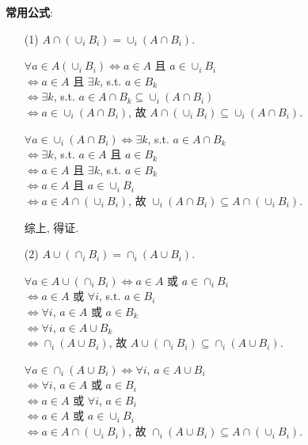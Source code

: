 \documentclass{note}
\begin{document}
\textbf{常用公式}:
\begin{itemize}
    \item[(1)] $A\cap(\cup_i B_i)=\cup_i(A\cap B_i)$.
    \begin{pf}
        $\forall a\in A(\cup_i B_i)\Longleftrightarrow a\in A$ 且 $a\in \cup_iB_i$\\
        $\Longleftrightarrow a\in A$ 且 $\exists k$, s.t. $a\in B_k$\\
        $\Longleftrightarrow\exists k$, s.t. $a\in A\cap B_k\subseteq\cup_i(A\cap B_i)$\\
        $\Longleftrightarrow a\in\cup_i(A\cap B_i)$, 故 $A\cap(\cup_iB_i)\subseteq\cup_i(A\cap B_i)$.

        $\forall a\in\cup_i(A\cap B_i)\Longleftrightarrow\exists k$, s.t. $a\in A\cap B_k$\\
        $\Longleftrightarrow\exists k$, s.t. $a\in A$ 且 $a\in B_k$\\
        $\Longleftrightarrow a\in A$ 且 $\exists k$, s.t. $a\in B_k$\\
        $\Longleftrightarrow a\in A$ 且 $a\in\cup_iB_i$\\
        $\Longleftrightarrow a\in A\cap(\cup_iB_i)$, 故 $\cup_i(A\cap B_i)\subseteq A\cap(\cup_iB_i)$.

        综上, 得证.
    \end{pf}
    \item[(2)] $A\cup(\cap_iB_i)=\cap_i(A\cup B_i)$.
    \begin{pf}
        $\forall a\in A\cup(\cap_iB_i)\Longleftrightarrow a\in A$ 或 $a\in\cap_iB_i$\\
        $\Longleftrightarrow a\in A$ 或 $\forall i$, s.t. $a\in B_i$\\
        $\Longleftrightarrow\forall i$, $a\in A$ 或 $a\in B_k$\\
        $\Longleftrightarrow\forall i$, $a\in A\cup B_k$\\
        $\Longleftrightarrow\cap_i(A\cup B_i)$, 故 $A\cup(\cap_iB_i)\subseteq\cap_i(A\cup B_i)$.

        $\forall a\in\cap_i(A\cup B_i)\Longleftrightarrow\forall i$, $a\in A\cup B_i$\\
        $\Longleftrightarrow\forall i$, $a\in A$ 或 $a\in B_i$\\
        $\Longleftrightarrow a\in A$ 或 $\forall i$, $a\in B_i$\\
        $\Longleftrightarrow a\in A$ 或 $a\in\cup_iB_i$\\
        $\Longleftrightarrow a\in A\cap(\cup_iB_i)$, 故 $\cap_i(A\cup B_i)\subseteq A\cap(\cup_iB_i)$.


\end{pf}
\end{itemize}
\end{document}
